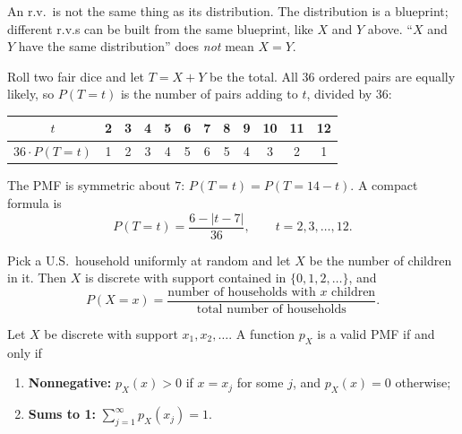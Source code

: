 \bigskip

\begin{pitfall}
An r.v.\ is not the same thing as its distribution. The distribution is a blueprint; different r.v.s can be built from the same blueprint, like $X$ and $Y$ above. ``$X$ and $Y$ have the same distribution'' does \emph{not} mean $X = Y$.
\end{pitfall}

\bigskip

\begin{example}\label{ex:dicesum}
Roll two fair dice and let $T = X + Y$ be the total. All $36$ ordered pairs are equally likely, so $P(T = t)$ is the number of pairs adding to $t$, divided by $36$:
\medskip
\begin{center}
\begin{tabular}{@{}c*{11}{c}@{}}
\toprule
$t$ & 2 & 3 & 4 & 5 & 6 & 7 & 8 & 9 & 10 & 11 & 12 \\
\midrule
$36 \cdot P(T = t)$ & 1 & 2 & 3 & 4 & 5 & 6 & 5 & 4 & 3 & 2 & 1 \\
\bottomrule
\end{tabular}
\end{center}
\medskip
The PMF is symmetric about $7$: $P(T = t) = P(T = 14 - t)$. A compact formula is
\medskip
\[
P(T = t) = \frac{6 - |t - 7|}{36}, \qquad t = 2, 3, \dots, 12.
\]
\end{example}

\bigskip

\begin{example}
Pick a U.S.\ household uniformly at random and let $X$ be the number of children in it. Then $X$ is discrete with support contained in $\{0, 1, 2, \dots\}$, and
\medskip
\[
P(X = x) = \frac{\text{number of households with } x \text{ children}}{\text{total number of households}}.
\]
\end{example}

\bigskip

\begin{theorem}\label{thm:validpmf}
Let $X$ be discrete with support $x_1, x_2, \dots$. A function $p_X$ is a valid PMF if and only if
\medskip
\begin{enumerate}
  \setlength{\itemsep}{0.4em}
  \item \textbf{Nonnegative:} $p_X(x) > 0$ if $x = x_j$ for some $j$, and $p_X(x) = 0$ otherwise;
  \item \textbf{Sums to 1:} $\displaystyle \sum_{j=1}^{\infty} p_X(x_j) = 1$.
\end{enumerate}
\end{theorem}

